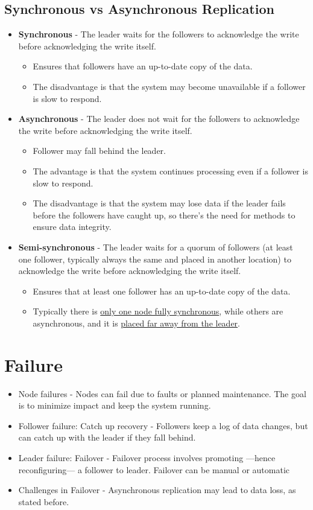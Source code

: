 \subsection{Synchronous vs Asynchronous Replication}
\begin{itemize}
   \item \textbf{Synchronous} - The leader waits for the followers to acknowledge the write before acknowledging the write itself.
   \begin{itemize}
      \item Ensures that followers have an up-to-date copy of the data.
      \item The disadvantage is that the system may become unavailable if a follower is slow to respond.
   \end{itemize}
   \item \textbf{Asynchronous} - The leader does not wait for the followers to acknowledge the write before acknowledging the write itself.
   \begin{itemize}
      \item Follower may fall behind the leader.
      \item The advantage is that the system continues processing even if a follower is slow to respond.
      \item The disadvantage is that the system may lose data if the leader fails before the followers have caught up, so there's the need for methods to ensure data integrity.
   \end{itemize}
   \item \textbf{Semi-synchronous} - The leader waits for a quorum of followers (at least one follower, typically always the same and placed in another location) to acknowledge the write before acknowledging the write itself.
   \begin{itemize}
      \item Ensures that at least one follower has an up-to-date copy of the data.
      \item Typically there is \ul{only one node fully synchronous}, while others are asynchronous, and it is \ul{placed far away from the leader}.
   \end{itemize}
\end{itemize}

\section{Failure}
\begin{itemize}
   \item Node failures - Nodes can fail due to faults or planned maintenance. The goal is to minimize impact and keep the system running.
   \item Follower failure: Catch up recovery - Followers keep a log of data changes, but can catch up with the leader if they fall behind.
   \item Leader failure: Failover - Failover process involves promoting ---hence reconfiguring--- a follower to leader. Failover can be manual or automatic
   \item Challenges in Failover - Asynchronous replication may lead to data loss, as stated before.
\end{itemize}

